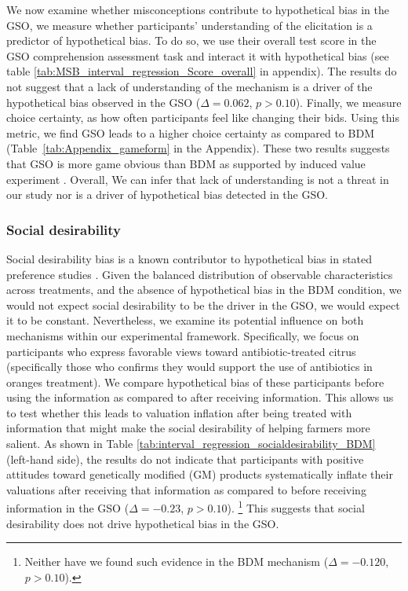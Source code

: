 \documentclass[12pt]{article}
\begin{document}
We now examine whether misconceptions contribute to hypothetical bias in the GSO, we measure whether participants' understanding of the elicitation is a predictor of hypothetical bias. To do so, we use their overall test score in the GSO comprehension assessment task and interact it with hypothetical bias (see table \ref{tab:MSB_interval_regression_Score_overall} in appendix). The results do not suggest that a lack of understanding of the mechanism is a driver of the hypothetical bias observed in the GSO (\(\Delta = 0.062\), \(p > 0.10\)). Finally, we measure choice certainty, as how often participants feel like changing their bids. Using this metric, we find GSO leads to a higher choice certainty as compared to BDM (Table~\ref{tab:Appendix_gameform} in the Appendix). These two results suggests that GSO is more game obvious than BDM as supported by induced value experiment  \citep{chakraborty_future_2025,brown_is_2023}.
Overall, We can infer that lack of understanding is not a threat in our study nor is a driver of hypothetical bias detected in the GSO.



\subsubsection{Social desirability}
Social desirability bias is a known contributor to hypothetical bias in stated preference studies \citep{norwood2011social, entem2022using}. Given the balanced distribution of observable characteristics across treatments, and the absence of hypothetical bias in the BDM condition, we would not expect social desirability to be the driver in the GSO, we would expect it to be constant. Nevertheless, we examine its potential influence on both mechanisms within our experimental framework. Specifically, we focus on participants who express favorable views toward antibiotic-treated citrus (specifically those who confirms they would support the use of antibiotics in oranges treatment). We compare hypothetical bias of these participants before using the information as compared to after receiving information. This allows us to test whether this leads to valuation inflation after being treated with information that might make the social desirability of helping farmers more salient. As shown in Table \ref{tab:interval_regression_socialdesirability_BDM} (left-hand side), the results do not indicate that participants with positive attitudes toward genetically modified (GM) products systematically inflate their valuations after receiving that information as compared to before receiving information in the GSO (\(\Delta = -0.23\), \(p > 0.10\)). \footnote{Neither have we found such evidence in the BDM mechanism (\(\Delta = -0.120\), \(p > 0.10\)).} This suggests that social desirability does not drive hypothetical bias in the GSO.
\end{document}
